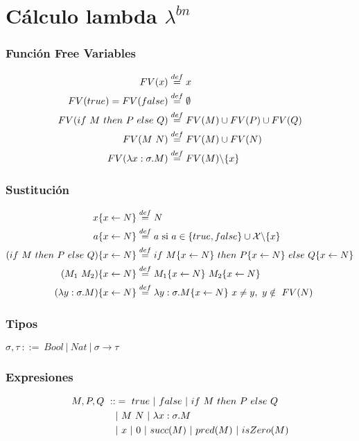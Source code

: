 \documentclass[10pt,a4paper]{article}
\begin{document}
\newpage
\section{Cálculo lambda $\lambda^{bn}$}
\subsubsection*{Función Free Variables}
\begin{equation*}
\begin{split}
FV(x) &\overset{def}{=} {x} \\
FV(true) = FV(false) &\overset{def}{=} \emptyset \\
FV(if~ M~ then~ P~ else~ Q) &\overset{def}{=} FV(M)\cup FV(P)\cup FV(Q) \\
FV(M~N) &\overset{def}{=} FV(M)\cup FV(N) \\
FV(\lambda x: \sigma . M) &\overset{def}{=} FV(M) \backslash \{x\}
\end{split}
\end{equation*}
\subsubsection*{Sustitución}
\begin{equation*}
\begin{split}
x\{x\leftarrow N\} &\overset{def}{=} N \\
a\{x\leftarrow N\} &\overset{def}{=} a \text{ si } a \in \{true,false\}\cup\mathcal{X}\backslash\{x\} \\
(if~ M~ then~ P~ else~ Q)\{x\leftarrow N\} &\overset{def}{=} if~ M\{x\leftarrow N\}~ then~ P\{x\leftarrow N\}~ else~ Q\{x\leftarrow N\}\\
(M_1~M_2)\{x\leftarrow N\} &\overset{def}{=} M_1\{x\leftarrow N\}~M_2\{x\leftarrow N\}\\
(\lambda y: \sigma . M)\{x\leftarrow N\} &\overset{def}{=} \lambda y: \sigma . M\{x\leftarrow N\}~x\neq y,~y\notin~FV(N)
\end{split}
\end{equation*}

\subsubsection{Tipos}
$\sigma, \tau ~::=~ Bool~|~Nat~|~\sigma\to\tau$
\subsubsection*{Expresiones}
\begin{equation}
\begin{split}
M, P, Q ~ ::&= ~ true~|~ false~|~ if~ M~ then~ P~ else~ Q \\
&|~ M~N~|~ \lambda x: \sigma . M \\
&|~x~|~0~|~succ(M)~|~pred(M)~|~isZero(M)
\end{split}
\end{equation}
\end{document}
